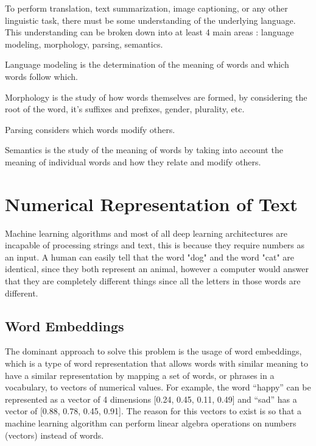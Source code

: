 To perform translation, text summarization, image captioning, or any other linguistic task, there must be some understanding of the underlying language. This understanding can be broken down into at least 4 main areas : language modeling, morphology, parsing, semantics. \par 

Language modeling is the determination of the meaning of words and which words follow which. \par

Morphology is the study of how words themselves are formed, by considering the root of the word, it's suffixes and prefixes, gender, plurality, etc.

Parsing considers which words modify others. \par

Semantics is the study of the meaning of words by taking into account the meaning of individual words  and how they relate and modify others. \cite{Otter2018} \par 



\section{Numerical Representation of Text}


\par Machine learning algorithms and most of all deep learning architectures are incapable of processing strings and text, this is because they require numbers as an input. \cite{Vidhya2017} A human can easily tell that the word "dog" and the word "cat" are identical, since they both represent an animal, however a computer would answer that they are completely different things since all the letters in those words are different. 

    \subsection{Word Embeddings}

    \par The dominant approach to solve this problem is the usage of word embeddings, which is a type of word representation that allows words with similar meaning to have a similar representation by mapping a set of words, or phrases in a vocabulary, to vectors of numerical values. For example, the word “happy” can be represented as a vector of 4 dimensions [0.24, 0.45, 0.11, 0.49] and “sad” has a vector of [0.88, 0.78, 0.45, 0.91]. The reason for this vectors to exist is so that a machine learning algorithm can perform linear algebra operations on numbers (vectors) instead of words. \cite{MuratMustafa}

